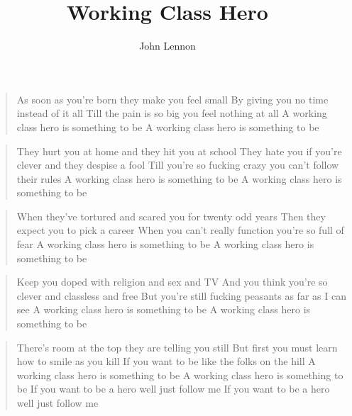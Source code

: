 \documentclass[9pt,a4paper,oneside, onecolumn]{article}
\author{John Lennon}
\title{Working Class Hero}
\date{}
\begin{document}
\begin{verse}
As soon as you're born they make you feel small
By giving you no time instead of it all
Till the pain is so big you feel nothing at all
A working class hero is something to be
A working class hero is something to be
\end{verse}

\begin{verse}
They hurt you at home and they hit you at school
They hate you if you're clever and they despise a fool
Till you're so fucking crazy you can't follow their rules
A working class hero is something to be
A working class hero is something to be
\end{verse}

\begin{verse}
When they've tortured and scared you for twenty odd years
Then they expect you to pick a career
When you can't really function you're so full of fear
A working class hero is something to be
A working class hero is something to be
\end{verse}

\begin{verse}
Keep you doped with religion and sex and TV
And you think you're so clever and classless and free
But you're still fucking peasants as far as I can see
A working class hero is something to be
A working class hero is something to be
\end{verse}

\begin{verse}
There's room at the top they are telling you still
But first you must learn how to smile as you kill
If you want to be like the folks on the hill
A working class hero is something to be
A working class hero is something to be
If you want to be a hero well just follow me
If you want to be a hero well just follow me
\end{verse}
\end{document}
